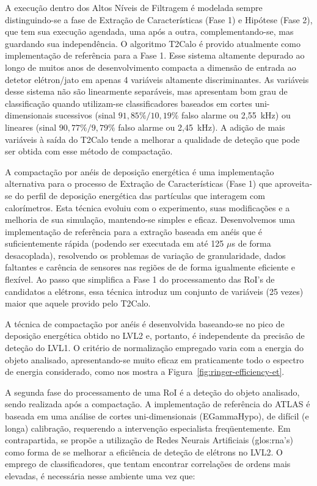 A execução dentro dos Altos Níveis de Filtragem é modelada sempre
distinguindo-se a fase de Extração de Características (Fase 1) e Hipótese
(Fase 2), que tem sua execução agendada, uma após a outra, complementando-se,
mas guardando sua independência. O algoritmo T2Calo é provido atualmente como
implementação de referência para a Fase 1. Esse sistema altamente depurado ao
longo de muitos anos de desenvolvimento compacta a dimensão de entrada ao
detetor elétron/jato em apenas 4 variáveis altamente discriminantes. As
variáveis desse sistema não são linearmente separáveis, mas apresentam bom
grau de classificação quando utilizam-se classificadores baseados em cortes
uni-dimensionais sucessivos (sinal $91,85\%/10,19\%$ falso alarme ou 2,55~kHz)
ou lineares (sinal $90,77\%/9,79\%$ falso alarme ou 2,45~kHz). A adição de
mais variáveis à saída do T2Calo tende a melhorar a qualidade de deteção que
pode ser obtida com esse método de compactação.

A compactação por anéis de deposição energética é uma implementação
alternativa para o processo de Extração de Características (Fase 1) que
aproveita-se do perfil de deposição energética das partículas que interagem
com calorímetros. Esta técnica evoluiu com o experimento, suas modificações e
a melhoria de sua simulação, mantendo-se simples e eficaz. Desenvolvemos uma
implementação de referência para a extração baseada em anéis que é
suficientemente rápida (podendo ser executada em até 125 $\mu$s de forma
desacoplada), resolvendo os problemas de variação de granularidade, dados
faltantes e carência de sensores nas regiões de  de forma
igualmente eficiente e flexível. Ao passo que simplifica a Fase 1 do
processamento das RoI's de candidatos a elétrons, essa técnica introduz um
conjunto de variáveis (25 vezes) maior que aquele provido pelo T2Calo.

A técnica de compactação por anéis é desenvolvida baseando-se no pico de
deposição energética obtido no LVL2 e, portanto, é independente da precisão de
deteção do LVL1. O critério de normalização empregado varia com a energia do
objeto analisado, apresentando-se muito eficaz em praticamente todo o espectro
de energia considerado, como nos mostra a
Figura~\ref{fig:ringer-efficiency-et}.

A segunda fase do processamento de uma RoI é a deteção do objeto analisado,
sendo realizada após a compactação. A implementação de referência do ATLAS é
baseada em uma análise de cortes uni-dimensionais (EGammaHypo), de difícil (e
longa) calibração, requerendo a intervenção especialista freqüentemente. Em
contrapartida, se propõe a utilização de Redes Neurais Artificiais
(\gls{glos:rna}'s) como forma de se melhorar a eficiência de deteção de
elétrons no LVL2. O emprego de classificadores, que tentam encontrar
correlações de ordens mais elevadas, é necessária nesse ambiente uma vez que:

